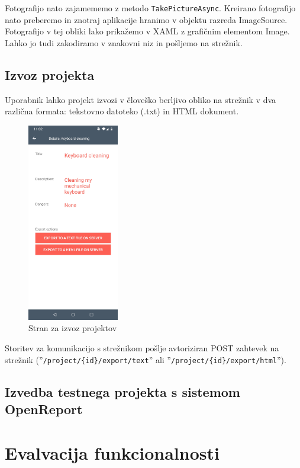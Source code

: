 \documentclass[a4paper, 12pt]{book}
\begin{document}
Fotografijo nato zajamememo z metodo \texttt{TakePictureAsync}.
Kreirano fotografijo nato preberemo in znotraj aplikacije hranimo v objektu razreda ImageSource.
Fotografijo v tej obliki lako prikažemo v XAML z grafičnim elementom Image.
Lahko jo tudi zakodiramo v znakovni niz in pošljemo na strežnik.


\subsection{Izvoz projekta}

Uporabnik lahko projekt izvozi v človeško berljivo obliko na strežnik v dva različna formata: tekstovno datoteko (.txt) in HTML dokument.

\begin{figure}[H]
\begin{center}
	\includegraphics[width=4cm]{app_project_export}
\end{center}
	\caption{Stran za izvoz projektov}
\label{app_note}
\end{figure}

Storitev za komunikacijo s strežnikom pošlje avtoriziran POST zahtevek na strežnik (''\texttt{/project/\{id\}/export/text}'' ali ''\texttt{/project/\{id\}/export/html}'').

\subsection{Izvedba testnega projekta s sistemom OpenReport}


\section{Evalvacija funkcionalnosti}
\end{document}
